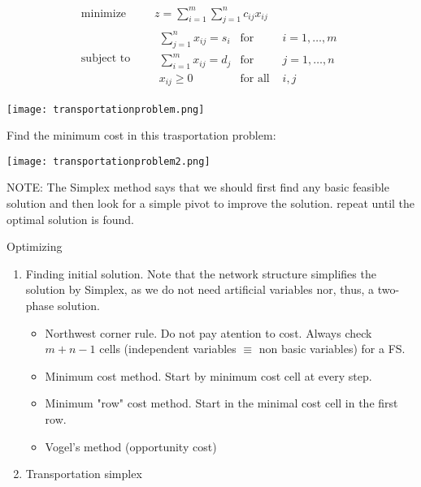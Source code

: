 \documentclass{beamer}
\begin{document}
\begin{frame}
  \begin{equation*}
    \begin{aligned}
      \text{minimize } \quad & z = \sum_{i=1}^m \sum_{j=1}^n c_{ij}x_{ij} \\
      \text{subject to }\quad &
      \begin{array}{rcl}
        \sum_{j=1}^n x_{ij}= s_i&\text{for }& i=1,\ldots,m \\
        \sum_{i=1}^m x_{ij} = d_j &\text{for }& j=1,\ldots,n \\
        x_{ij} \geq 0 & \text{for all } & i,j
      \end{array}
    \end{aligned}
  \end{equation*}
  \begin{center}
    \texttt{[image: transportationproblem.png]}
  \end{center}
\end{frame}

\begin{frame}
\begin{Exercise}
  Find the minimum cost in this trasportation problem:\cite{carter}
  \begin{center}
    \texttt{[image: transportationproblem2.png]}
  \end{center}
  NOTE: The Simplex method says that we should first find any basic feasible solution and then look for a simple pivot to improve the solution. repeat until the optimal solution is found.
\end{Exercise}
\end{frame}

\begin{frame}{Optimizing}
\begin{enumerate}
  \item Finding initial solution. Note that the network structure simplifies the solution by Simplex, as we do not need artificial variables nor, thus, a two-phase solution.
  \begin{itemize}
  \item Northwest corner rule. Do not pay atention to cost. Always check $m+n-1$ cells (independent variables $\equiv$ non basic variables) for a FS.
  \item Minimum cost method. Start by minimum cost cell at every step.
  \item Minimum "row" cost method. Start in the minimal cost cell in the first row.
  \item Vogel's method (opportunity cost)
  \end{itemize}
  \item Transportation simplex
\end{enumerate}
\end{frame}
\end{document}

